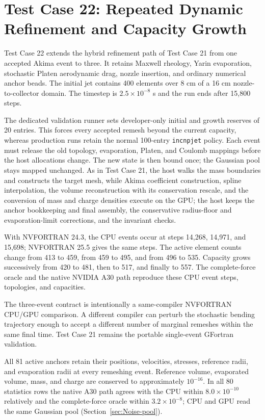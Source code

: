 \section{Test Case 22: Repeated Dynamic Refinement and Capacity Growth}

Test Case 22 extends the hybrid refinement path of Test Case 21 from one
accepted Akima event to three. It retains Maxwell rheology, Yarin evaporation,
stochastic Platen aerodynamic drag, nozzle insertion, and ordinary numerical
anchor beads. The initial jet contains 400 elements over 8 cm of a 16 cm
nozzle-to-collector domain. The timestep is $2.5\times10^{-8}$ s and the run
ends after 15,800 steps.

The dedicated validation runner sets developer-only initial and growth
reserves of 20 entries. This forces every accepted remesh beyond the current
capacity, whereas production runs retain the normal 100-entry
\texttt{incnpjet} policy. Each event must release the old topology,
evaporation, Platen, and Coulomb mappings before the host allocations change.
The new state is then bound once; the Gaussian pool stays mapped unchanged.
As in Test Case 21, the host walks the mass boundaries and constructs the
target mesh, while Akima coefficient construction, spline interpolation,
the volume reconstruction with its conservation rescale, and the conversion
of mass and charge densities execute on the GPU; the host keeps the anchor
bookkeeping and final assembly, the conservative radius-floor and
evaporation-limit corrections, and the invariant checks.

With NVFORTRAN 24.3, the CPU events occur at steps 14,268, 14,971, and 15,698;
NVFORTRAN 25.5 gives the same steps.
The active element counts change from 413 to 459, from 459 to 495, and from
496 to 535. Capacity grows successively from 420 to 481, then to 517, and
finally to 557. The complete-force oracle and the native NVIDIA A30 path
reproduce these CPU event steps, topologies, and capacities.

The three-event contract is intentionally a same-compiler NVFORTRAN CPU/GPU
comparison. A different compiler can perturb the stochastic bending
trajectory enough to accept a different number of marginal remeshes within
the same final time. Test Case 21 remains the portable single-event GFortran
validation.

All 81 active anchors retain their positions, velocities, stresses, reference
radii, and evaporation radii at every remeshing event. Reference volume,
evaporated volume, mass, and charge are conserved to approximately
$10^{-16}$. In all 80 statistics rows the native A30 path agrees with the CPU
within $8.0\times10^{-10}$ relatively and the complete-force oracle within
$3.2\times10^{-8}$; CPU and GPU read the same Gaussian pool
(Section~\ref{sec:Noise-pool}).

